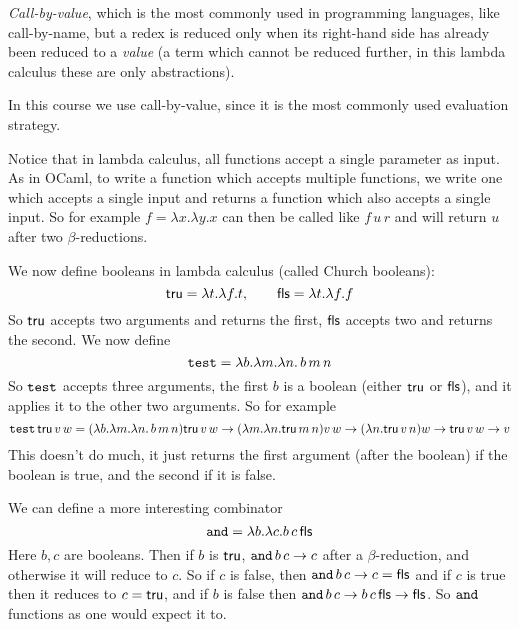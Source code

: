 
    \item {\it Call-by-value}, which is the most commonly used in programming languages, like call-by-name, but a redex is reduced only when its right-hand side has already been
        reduced to a {\it value} (a term which cannot be reduced further, in this lambda calculus these are only abstractions).

\eenum

In this course we use call-by-value, since it is the most commonly used evaluation strategy.

Notice that in lambda calculus, all functions accept a single parameter as input.
As in OCaml, to write a function which accepts multiple functions, we write one which accepts a single input and returns a function which also accepts a single input.
So for example $f=\lambda x.\lambda y.x$ can then be called like $f\,u\,r$ and will return $u$ after two $\beta$-reductions.

We now define booleans in lambda calculus (called Church booleans):
$$ \tru=\lambda t.\lambda f.t,\qquad \fls=\lambda t.\lambda f.f $$
So ${\sf tru}$ accepts two arguments and returns the first, ${\sf fls}$ accepts two and returns the second.
We now define
$$ \test=\lambda b.\lambda m.\lambda n.\,b\,m\,n $$
So $\test$ accepts three arguments, the first $b$ is a boolean (either ${\sf tru}$ or ${\sf fls}$), and it applies it to the other two arguments.
So for example
$$ \test\,\tru\,v\,w = (\lambda b.\lambda m.\lambda n.\,b\,m\,n)\tru\,v\,w \to (\lambda m.\lambda n.\tru\,m\,n)v\,w \to (\lambda n.\tru\,v\,n)w\to \tru\,v\,w \to v $$
This doesn't do much, it just returns the first argument (after the boolean) if the boolean is true, and the second if it is false.

We can define a more interesting combinator
$$ \and = \lambda b.\lambda c.b\,c\,\fls $$
Here $b,c$ are booleans.
Then if $b$ is ${\sf tru}$, $\and\,b\,c\to c$ after a $\beta$-reduction, and otherwise it will reduce to $c$.
So if $c$ is false, then $\and\,b\,c\to c=\fls$ and if $c$ is true then it reduces to $c={\sf tru}$, and if $b$ is false then $\and\,b\,c\to b\,c\,\fls\to\fls$.
So $\and$ functions as one would expect it to.

